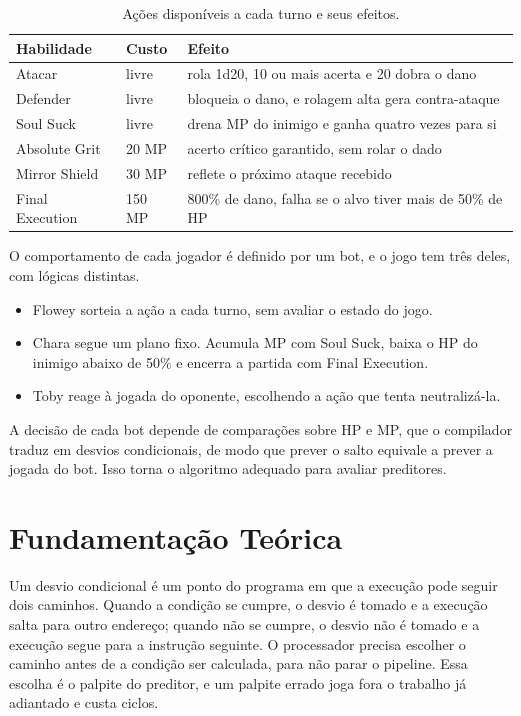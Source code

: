 \documentclass[12pt]{article}
\begin{document}
\begin{table}[ht]
\centering
\caption{Ações disponíveis a cada turno e seus efeitos.}
\label{tab:skills}
\small
\begin{tabular}{@{}llp{8cm}@{}}
\toprule
Habilidade & Custo & Efeito \\
\midrule
Atacar & livre & rola 1d20, 10 ou mais acerta e 20 dobra o dano \\
Defender & livre & bloqueia o dano, e rolagem alta gera contra-ataque \\
Soul Suck & livre & drena MP do inimigo e ganha quatro vezes para si \\
Absolute Grit & 20 MP & acerto crítico garantido, sem rolar o dado \\
Mirror Shield & 30 MP & reflete o próximo ataque recebido \\
Final Execution & 150 MP & 800\% de dano, falha se o alvo tiver mais de 50\% de HP \\
\bottomrule
\end{tabular}
\end{table}

O comportamento de cada jogador é definido por um bot, e o jogo tem três
deles, com lógicas distintas.

\begin{itemize}[nosep]
  \item Flowey sorteia a ação a cada turno, sem avaliar o estado do jogo.
  \item Chara segue um plano fixo. Acumula MP com Soul Suck, baixa o HP do
    inimigo abaixo de 50\% e encerra a partida com Final Execution.
  \item Toby reage à jogada do oponente, escolhendo a ação que tenta
    neutralizá-la.
\end{itemize}

A decisão de cada bot depende de comparações sobre HP e MP, que o compilador
traduz em desvios condicionais, de modo que prever o salto equivale a prever
a jogada do bot. Isso torna o algoritmo adequado para avaliar preditores.

\section{Fundamentação Teórica}

Um desvio condicional é um ponto do programa em que a execução pode seguir
dois caminhos. Quando a condição se cumpre, o desvio é tomado e a execução
salta para outro endereço; quando não se cumpre, o desvio não é tomado e a
execução segue para a instrução seguinte. O processador precisa escolher o
caminho antes de a condição ser calculada, para não parar o pipeline. Essa
escolha é o palpite do preditor, e um palpite errado joga fora o trabalho já
adiantado e custa ciclos.
\end{document}

